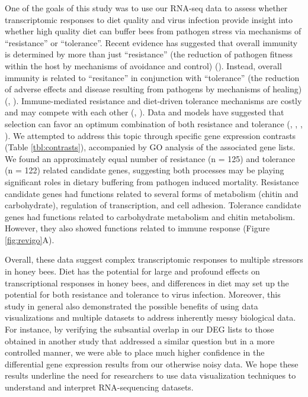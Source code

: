 \documentclass[11pt,a4paper,oldfontcommands,openany]{memoir}
\numberwithin{equation}{section} %
\begin{document}
One of the goals of this study was to use our RNA-seq data to assess whether transcriptomic responses to diet quality and virus infection provide insight into whether high quality diet can buffer bees from pathogen stress via mechanisms of ``resistance'' or ``tolerance''. Recent evidence has suggested that overall immunity is determined by more than just ``resistance'' (the reduction of pathogen fitness within the host by mechanisms of avoidance and control) (\citealt{resTol2}). Instead, overall immunity is related to ``resitance'' in conjunction with ``tolerance'' (the reduction of adverse effects and disease resulting from pathogens by mechanisms of healing) (\citealt{resTol1}, \citealt{resTol2}). Immune-mediated resistance and diet-driven tolerance mechanisms are costly and may compete with each other (\citealt{resTol1}, \citealt{resTol4}). Data and models have suggested that selection can favor an optimum combination of both resistance and tolerance (\citealt{resTol5}, \citealt{resTol6}, \citealt{resTol7}, \citealt{resTol8}). We attempted to address this topic through specific gene expression contrasts (Table \ref{tbl:contrasts}), accompanied by GO analysis of the associated gene lists. We found an approximately equal number of resistance (n = 125) and tolerance (n = 122) related candidate genes, suggesting both processes may be playing significant roles in dietary buffering from pathogen induced mortality. Resistance candidate genes had functions related to several forms of metabolism (chitin and carbohydrate), regulation of transcription, and cell adhesion. Tolerance candidate genes had functions related to carbohydrate metabolism and chitin metabolism. However, they also showed functions related to immune response (Figure \ref{fig:revigo}A).

Overall, these data suggest complex transcriptomic responses to multiple stressors in honey bees. Diet has the potential for large and profound effects on transcriptional responses in honey bees, and differences in diet may set up the potential for both resistance and tolerance to virus infection. Moreover, this study in general also demonstrated the possible benefits of using data visualizations and multiple datasets to address inherently messy biological data. For instance, by verifying the subsantial overlap in our DEG lists to those obtained in another study that addressed a similar question but in a more controlled manner, we were able to place much higher confidence in the differential gene expression results from our otherwise noisy data. We hope these results underline the need for researchers to use data visualization techniques to understand and interpret RNA-sequencing datasets.
\end{document}
